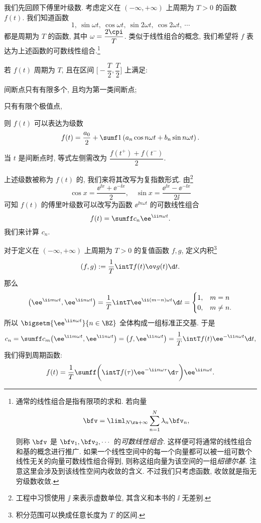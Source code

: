 我们先回顾下傅里叶级数.
考虑定义在 $(-\infty,+\infty)$ 上周期为 $T>0$ 的函数 $f(t)$.
我们知道函数
\[
  1,\ \sin{\omega t},\ \cos{\omega t},\ 
  \sin{2\omega t},\ \cos{2\omega t},\ \cdots
\]
都是周期为 $T$ 的函数, 其中 $\omega=\dfrac{2\cpi}T$.
类似于线性组合的概念, 我们希望将 $f$ 表达为上述函数的可数线性组合.\footnote{
  通常的线性组合是指有限项的求和.
  若向量
  \[
    \bfv=\liml_{N\ra+\infty} \sum_{n=1}^N\lambda_n \bfv_n,
  \]
  则称 $\bfv$ 是 $\bfv_1,\bfv_2,\cdots$ 的\emph{可数线性组合}.
  这样便可将通常的线性组合和基的概念进行推广.
  如果一个线性空间中的每一个向量都可以被一组可数个线性无关的向量可数线性组合得到, 则称这组向量为该空间的一组\emph{绍德尔基}.
  注意这里会涉及到该线性空间内收敛的含义.
  不过我们只考虑函数, 收敛就是指无穷级数收敛.
}

\begin{theorem}
  若 $f(t)$ 周期为 $T$, 且在区间 $\bigl[-\dfrac T2,\dfrac T2\bigr]$ 上满足:
  \begin{enuma}[labelindent=.5em]
    \item 间断点只有有限多个, 且均为第一类间断点;
    \item 只有有限个极值点,
  \end{enuma}
  则 $f(t)$ 可以表达为级数
  \[
    f(t)=\frac{a_0}2+\sumf1 \left(a_n\cos n\omega t+b_n \sin n\omega t\right).
  \]
  当 $t$ 是间断点时, 等式左侧需改为 $\dfrac{f(t^+)+f(t^-)}2$.
\end{theorem}
上述级数被称为 $f(t)$ 的, 我们来将其改写为复指数形式.
由\footnote{工程中习惯使用 $\jj$ 来表示虚数单位, 其含义和本书的 $\ii$ 无差别.}
\[
  \cos x=\frac{\ee^{\ii x}+\ee^{-\ii x}}2,\quad \sin x=\frac{\ee^{\ii x}-\ee^{-\ii x}}{2\ii }
\]
可知 $f(t)$ 的傅里叶级数可以改写为函数 $\ee^{\ii n\omega t}$ 的可数线性组合
\[
  f(t)=\sumff c_n\ee^{\ii n\omega t}.
\]
我们来计算 $c_n$.

对于定义在 $(-\infty,+\infty)$ 上周期为 $T>0$ 的\alert{复值}函数 $f,g$, 定义内积\footnote{
  积分范围可以换成任意长度为 $T$ 的区间.
}
\[
  (f,g):=\frac1T\intT f(t)\ov g(t)\d t.
\]
那么
\[
  \bigl(\ee^{\ii m\omega t},\ee^{\ii n\omega t}\bigr)
  =\frac1T\intT \ee^{\ii (m-n)\omega t}\d t
  =\begin{cases}
    1,&m=n\\
    0,&m\neq n.
  \end{cases}
\]
所以 $\bigsetm{\ee^{\ii n\omega t}}{n\in\BZ}$ 全体构成一组标准正交基. 于是
\[
  c_n=\sumff c_m\bigl(\ee^{\ii m\omega t},\ee^{\ii n\omega t}\bigr)
  =\bigl(f,\ee^{\ii n\omega t}\bigr)
  =\frac 1T\intT f(t)\ee^{-\ii n\omega t} \d t,
\]
我们得到周期函数:
\[
  f(t)=\frac 1T\sumff \biggl(\intT f(\tau)\ee^{-\ii n\omega\tau} \d\tau\biggr) \ee^{\ii n\omega t}.
\]

